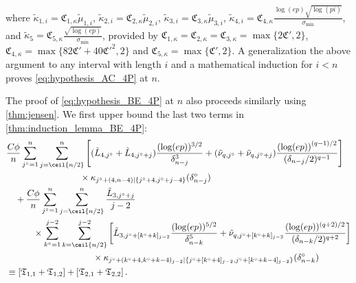 \documentclass[aos]{imsart}
\begin{document}
\begin{appendix}
where $\tilde\kappa_{1,i} = \mathfrak{C}_{1,\kappa} \tilde\mu_{1,i}$, 
$\tilde\kappa_{2,i} = \mathfrak{C}_{2,\kappa} \tilde\mu_{2,i}$, 
$\tilde\kappa_{3,i} = \mathfrak{C}_{3,\kappa} \tilde\mu_{3,i}$, 
$\tilde\kappa_{4,i} = \mathfrak{C}_{4,\kappa} \frac{\log(ep)\sqrt{\log(pi)}}{\sigma_{\min}}$, and
$\tilde\kappa_{5} = \mathfrak{C}_{5,\kappa} \frac{\sqrt{\log(ep)}}{\sigma_{\min}}$, provided by $\mathfrak{C}_{1,\kappa} = \mathfrak{C}_{2,\kappa} = \mathfrak{C}_{3,\kappa} = \max\{2 \mathfrak{C}', 2\}$, $\mathfrak{C}_{4,\kappa} = \max\{82 \mathfrak{C}' + 40 \mathfrak{C}'^2, 2\}$ and
$\mathfrak{C}_{5,\kappa} = \max\{ \mathfrak{C}', 2\}$. 
A generalization the above argument to any interval with length $i$ and a mathematical induction for $i < n$ proves \eqref{eq:hypothesis_AC_4P} at $n$.

\medskip
The proof of \eqref{eq:hypothesis_BE_4P} at $n$ also proceeds similarly using \cref{thm:jensen}. We first upper bound the last two terms in \cref{thm:induction_lemma_BE_4P}:
\begin{equation*}
\begin{aligned}
    & \frac{C \phi}{n} \sum_{j^\circ=1}^n \sum_{j=\ceil{n/2}}^{n} \left[ 
        (\tilde{L}_{4,j^\circ} + \tilde{L}_{4,j^\circ+j}) \frac{(\log(ep))^{3/2}}{\delta_{n-j}^3}
        + (\tilde\nu_{q,j^\circ} + \tilde\nu_{q,j^\circ+j}) \frac{{(\log(ep))}^{(q-1)/2}}{(\delta_{n-j}/2)^{q-1}}
    \right] \\
    & \quad \hspace{1in} \times \kappa_{j^\circ+(4,n-4)|\{j^\circ+4,j^\circ+j-4\}}(\delta_{n-j}^\circ) \\
    & \quad + \frac{C \phi}{n} \sum_{j^\circ=1}^n \sum_{j=\ceil{n/2}}^{n} \frac{\tilde L_{3,j^\circ+j}}{j-2} \\ 
    & \quad \quad \quad \times \sum_{k^\circ=1}^{j-2} \sum_{k=\ceil{n/2}}^{j-2} \left[ 
        \tilde L_{3,j^\circ+[k^\circ+k]_{j-2}} \frac{(\log(ep))^{5/2}}{\delta_{n-k}^5}
        + \tilde \nu_{q,j^\circ+[k^\circ+k]_{j-2}} \frac{(\log(ep))^{(q+2)/2}}{(\delta_{n-k}/2)^{q+2}}
    \right] \\
    & \quad \hspace{1.2in} \times \kappa_{j^\circ + (k^\circ+4,k^\circ+k-4)_{j-2}|\{j^\circ + [k^\circ+4]_{j-2},j^\circ + [k^\circ+k-4]_{j-2}\}}(\delta_{n-k}^\circ) \\
    & \equiv \left[ \mathfrak{T}_{1,1} + \mathfrak{T}_{1,2} \right] 
    + \left[ \mathfrak{T}_{2,1} + \mathfrak{T}_{2,2} \right].
\end{aligned}
\end{equation*}

\end{appendix}
\end{document}

